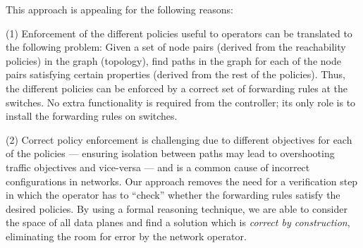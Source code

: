 This approach is appealing for the following reasons: 

(1)
Enforcement of the different policies useful to operators 
can be translated to 
the following problem: Given a set of node pairs 
(derived from the reachability policies) in the graph 
(topology), find paths in the graph for each
of the node pairs satisfying certain properties (derived
from the rest of the policies). 
Thus, the different policies can be enforced by 
a correct set of forwarding rules at the switches. 
No extra functionality is required from the controller;
its only role is to install the forwarding rules on switches.



(2) Correct policy enforcement is challenging due to different
objectives for each of the policies --- ensuring isolation between
paths may lead to overshooting traffic objectives and vice-versa ---
and is a common cause of incorrect configurations in networks.  Our
approach removes the need for a verification step in which the
operator has to ``check'' whether the forwarding rules satisfy the
desired policies.  By using a formal reasoning technique, we are able
to consider the space of all data planes and find a solution which is
\emph{correct by construction}, eliminating the room for error by the
network operator.


